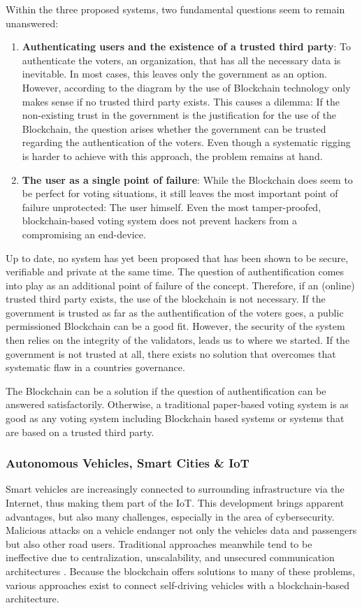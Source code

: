Within the three proposed systems, two fundamental questions seem to remain unanswered:
\begin{enumerate}
    \item \textbf{Authenticating users and the existence of a trusted third party}: To authenticate the voters, an organization, that has all the necessary data is inevitable. In most cases, this leaves only the government as an option. However, according to the diagram by \cite{Wust2017} the use of Blockchain technology only makes sense if no trusted third party exists. This causes a dilemma: If the non-existing trust in the government is the justification for the use of the Blockchain, the question arises whether the government can be trusted regarding the authentication of the voters. Even though a systematic rigging is harder to achieve with this approach, the problem remains at hand.
    \item \textbf{The user as a single point of failure}: While the Blockchain does seem to be perfect for voting situations, it still leaves the most important point of failure unprotected: The user himself. Even the most tamper-proofed, blockchain-based voting system does not prevent hackers from a compromising an end-device.
\end{enumerate}

Up to date, no system has yet been proposed that has been shown to be secure, verifiable and private at the same time. The question of authentification comes into play as an additional point of failure of the concept. \cite{Osgood2016}
Therefore, if an (online) trusted third party exists, the use of the blockchain is not necessary. If the government is trusted as far as the authentification of the voters goes, a public permissioned Blockchain can be a good fit. However, the security of the system then relies on the integrity of the validators,  leads us to where we started. If the government is not trusted at all, there exists no solution that overcomes that systematic flaw in a countries governance.

The Blockchain can be a solution if the question of authentification can be answered satisfactorily. Otherwise, a traditional paper-based voting system is as good as any voting system including Blockchain based systems or systems that are based on a trusted third party.

\subsubsection{Autonomous Vehicles, Smart Cities \& IoT}
Smart vehicles are increasingly connected to surrounding infrastructure via the Internet, thus making them part of the IoT. This development brings apparent advantages, but also many challenges, especially in the area of cybersecurity. Malicious attacks on a vehicle endanger not only the vehicles data and passengers but also other road users. Traditional approaches meanwhile tend to be ineffective due to centralization, unscalability, and unsecured communication architectures \cite{DorriSteger2017}. Because the blockchain offers solutions to many of these problems, various approaches exist to connect self-driving vehicles with a blockchain-based architecture.

